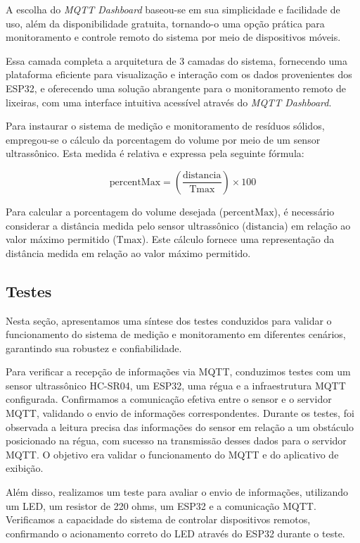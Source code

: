 \documentclass[12pt]{article}
\begin{document}
A escolha do \textit{MQTT Dashboard} baseou-se em sua simplicidade e facilidade de uso, além da disponibilidade gratuita, tornando-o uma opção prática para monitoramento e controle remoto do sistema por meio de dispositivos móveis.

Essa camada completa a arquitetura de 3 camadas do sistema, fornecendo uma plataforma eficiente para visualização e interação com os dados provenientes dos ESP32, e oferecendo uma solução abrangente para o monitoramento remoto de lixeiras, com uma interface intuitiva acessível através do \textit{MQTT Dashboard}.

Para instaurar o sistema de medição e monitoramento de resíduos sólidos, empregou-se o cálculo da porcentagem do volume por meio de um sensor ultrassônico. Esta medida é relativa e expressa pela seguinte fórmula:

\[
\text{percentMax} = \left( \frac{\text{distancia}}{\text{Tmax}} \right) \times 100
\]

Para calcular a porcentagem do volume desejada (\(\text{percentMax}\)), é necessário considerar a distância medida pelo sensor ultrassônico (\(\text{distancia}\)) em relação ao valor máximo permitido (\(\text{Tmax}\)). Este cálculo fornece uma representação da distância medida em relação ao valor máximo permitido.

\subsection{Testes}

Nesta seção, apresentamos uma síntese dos testes conduzidos para validar o funcionamento do sistema de medição e monitoramento em diferentes cenários, garantindo sua robustez e confiabilidade.

Para verificar a recepção de informações via MQTT, conduzimos testes com um sensor ultrassônico HC-SR04, um ESP32, uma régua e a infraestrutura MQTT configurada. Confirmamos a comunicação efetiva entre o sensor e o servidor MQTT, validando o envio de informações correspondentes. Durante os testes, foi observada a leitura precisa das informações do sensor em relação a um obstáculo posicionado na régua, com sucesso na transmissão desses dados para o servidor MQTT. O objetivo era validar o funcionamento do MQTT e do aplicativo de exibição.

Além disso, realizamos um teste para avaliar o envio de informações, utilizando um LED, um resistor de 220 ohms, um ESP32 e a comunicação MQTT. Verificamos a capacidade do sistema de controlar dispositivos remotos, confirmando o acionamento correto do LED através do ESP32 durante o teste.
\end{document}
